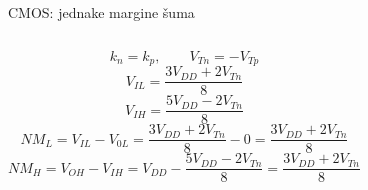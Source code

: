 \begin{frame}[label=09_2-s036]{CMOS: jednake margine šuma}
\setlength{\abovedisplayskip}{3pt}\setlength{\belowdisplayskip}{3pt}
\begin{columns}[T,onlytextwidth]\centering {}\[k_n=k_p,\qquad V_{Tn}=-V_{Tp}\]
\[V_{IL}=\frac{3V_{DD}+2V_{Tn}}8\]
\[V_{IH}=\frac{5V_{DD}-2V_{Tn}}8\]
\[NM_L=V_{IL}-V_{0L}=\frac{3V_{DD}+2V_{Tn}}8-0=\frac{3V_{DD}+2V_{Tn}}8\]
\[NM_H=V_{OH}-V_{IH}=V_{DD}-\frac{5V_{DD}-2V_{Tn}}8=\frac{3V_{DD}+2V_{Tn}}8\]
\end{columns}
\end{frame}
